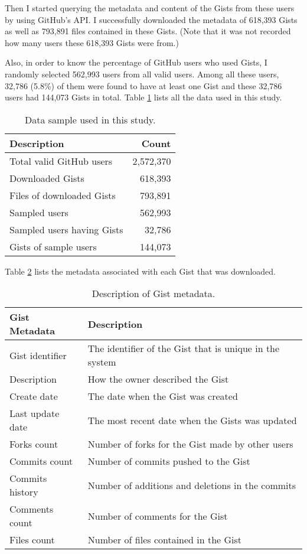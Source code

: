 Then I started querying the metadata and content of the Gists from these users by using GitHub's API. I successfully downloaded the metadata of 618,393 Gists as well as 793,891 files contained in these Gists. (Note that it was not recorded how many users these 618,393 Gists were from.) 

Also, in order to know the percentage of GitHub users who used Gists, I randomly selected 562,993 users from all valid users. Among all these users, 32,786 (5.8\%) of them were found to have at least one Gist and these 32,786 users had 144,073 Gists in total. Table \ref{tb:data} lists all the data used in this study. 

\begin{table}[!htb]
 \begin{center}
 \begin{tabular}{@{}lr} 
    \textbf{Description}                &   \textbf{Count}\\ \hline
    Total valid GitHub users      &   2,572,370\\
    Downloaded Gists              &   618,393\\
    \quad Files of downloaded Gists     &   793,891\\
    Sampled users                 &   562,993\\
    \quad Sampled users having Gists & 32,786\\
    \quad Gists of sample users & 144,073\\ \hline
 \end{tabular}
 \end{center}
 \caption{Data sample used in this study.}
 \label{tb:data}
\end{table}

Table \ref{tb:gistmetadata} lists the metadata associated with each Gist that was downloaded. 
\begin{table}[!htb]
 \begin{center}
 \begin{tabular}{@{}ll} 
    \textbf{Gist Metadata}	&	\textbf{Description}\\ \hline
    Gist identifier	&	The identifier of the Gist that is unique in the system\\
	Description	&	How the owner described the Gist\\
	Create date & The date when the Gist was created\\
	Last update date & The most recent date when the Gists was updated\\
	Forks count & Number of forks for the Gist made by other users\\
	Commits count & Number of commits pushed to the Gist\\
	Commits history & Number of additions and deletions in the commits\\
	Comments count & Number of comments for the Gist\\
	Files count & Number of files contained in the Gist\\ \hline
 \end{tabular}
 \end{center}
 \caption{Description of Gist metadata.}
 \label{tb:gistmetadata}
\end{table}

